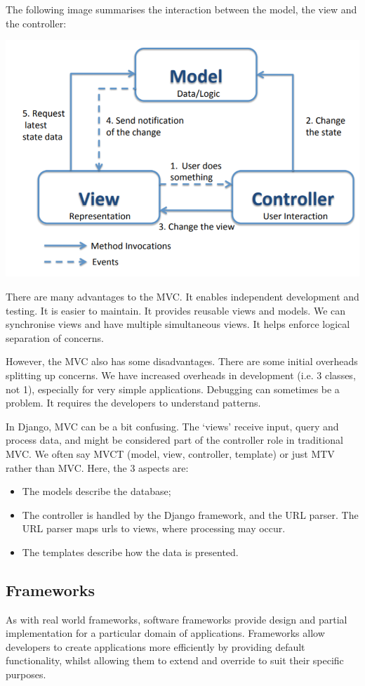 \documentclass[a4paper, openany]{memoir}
\begin{document}
\noindent The following image summarises the interaction between the model, the view and the controller:
\begin{center}
    \includegraphics[scale=0.5]{src/L19I1.PNG}
\end{center}
There are many advantages to the MVC. It enables independent development and testing. It is easier to maintain. It provides reusable views and models. We can synchronise views and have multiple simultaneous views. It helps enforce logical separation of concerns. 

\noindent However, the MVC also has some disadvantages. There are some initial overheads splitting up concerns. We have increased overheads in development (i.e. 3 classes, not 1), especially for very simple applications. Debugging can sometimes be a problem. It requires the developers to understand patterns.

\noindent In Django, MVC can be a bit confusing. The `views' receive input, query and process data, and might be considered part of the controller role in traditional MVC. We often say MVCT (model, view, controller, template) or just MTV rather than MVC. Here, the 3 aspects are:
\begin{itemize}
    \item The models describe the database;
    \item The controller is handled by the Django framework, and the URL parser. The URL parser maps urls to views, where processing may occur.
    \item The templates describe how the data is presented.
\end{itemize}

\subsection{Frameworks}
As with real world frameworks, software frameworks provide design and partial implementation for a particular domain of applications. Frameworks allow developers to create applications more efficiently by providing default functionality, whilst allowing them to extend and override to suit their specific purposes.
\end{document}
